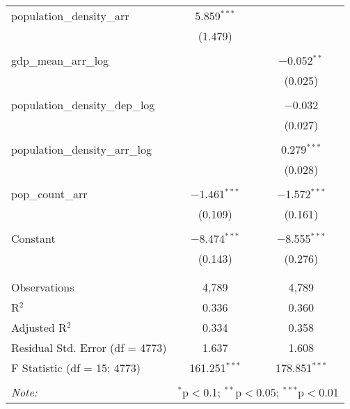 \begin{table}[!htbp]
\begin{tabular}{@{\extracolsep{5pt}}lcc}
 population\_density\_arr & 5.859$^{***}$ &  \\ 
  & (1.479) &  \\ 
  & & \\ 
 gdp\_mean\_arr\_log &  & $-$0.052$^{**}$ \\ 
  &  & (0.025) \\ 
  & & \\ 
 population\_density\_dep\_log &  & $-$0.032 \\ 
  &  & (0.027) \\ 
  & & \\ 
 population\_density\_arr\_log &  & 0.279$^{***}$ \\ 
  &  & (0.028) \\ 
  & & \\ 
 pop\_count\_arr & $-$1.461$^{***}$ & $-$1.572$^{***}$ \\ 
  & (0.109) & (0.161) \\ 
  & & \\ 
 Constant & $-$8.474$^{***}$ & $-$8.555$^{***}$ \\ 
  & (0.143) & (0.276) \\ 
  & & \\ 
\hline \\[-1.8ex] 
Observations & 4,789 & 4,789 \\ 
R$^{2}$ & 0.336 & 0.360 \\ 
Adjusted R$^{2}$ & 0.334 & 0.358 \\ 
Residual Std. Error (df = 4773) & 1.637 & 1.608 \\ 
F Statistic (df = 15; 4773) & 161.251$^{***}$ & 178.851$^{***}$ \\ 
\hline 
\hline \\[-1.8ex] 
\textit{Note:}  & \multicolumn{2}{r}{$^{*}$p$<$0.1; $^{**}$p$<$0.05; $^{***}$p$<$0.01} \\ 
\end{tabular} 
\end{table} 
